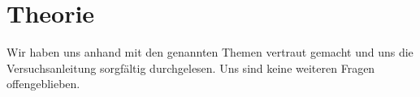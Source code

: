 \section{Theorie}
\label{sec:theorie}
Wir haben uns anhand \cite{Bleckwedel.Mathe2,Dorn.2008,Turtur.Sommersemester2017} mit den genannten Themen vertraut gemacht und uns die Versuchsanleitung sorgfältig durchgelesen. Uns sind keine weiteren Fragen offengeblieben.